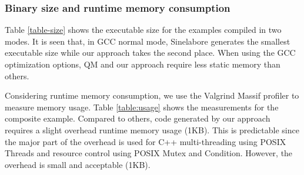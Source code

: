 \subsubsection{Binary size and runtime memory consumption} 
Table \ref{table-size} shows the executable size for the examples compiled in two modes.
It is seen that, in GCC normal mode, Sinelabore generates the smallest executable size while our approach takes the second place.
When using the GCC optimization options, QM and our approach require less static memory than others. 

Considering runtime memory consumption, we use the Valgrind Massif profiler\cite{Massif} to measure memory usage. 
Table \ref{table:usage} shows the measurements for the composite example. 
Compared to others, code generated by our approach requires a slight overhead runtime memory usage (1KB).
This is predictable since the major part of the overhead is used for C++ multi-threading using POSIX Threads and resource control using POSIX Mutex and Condition. 
However, the overhead is small and acceptable (1KB). 

